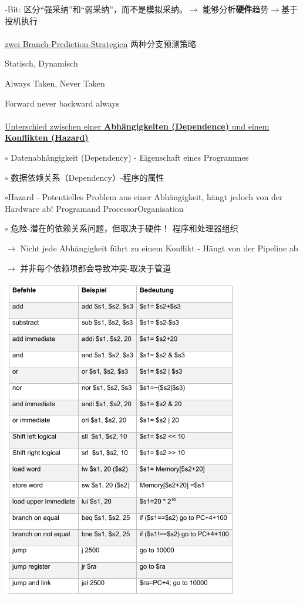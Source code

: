 \documentclass[fleqn]{article}
\begin{document}
-Bit: 区分“强采纳”和“弱采纳”，而不是模拟采纳。$\rightarrow$ 能够分析\textbf{硬件}趋势$\rightarrow$基于投机执行
\\
\\
\underline{zwei Branch-Prediction-Strategien} 两种分支预测策略

Statisch, Dynamisch 

Always Taken, Never Taken 

Forward never backward always
\\
\\
\noindent\underline{Unterschied zwischen einer \textbf{Abhängigkeiten (Dependence)} und einem \textbf{Konflikten (Hazard)}}

$\circ$ Datenabhängigkeit (Dependency) - Eigenschaft eines Programmes

$\circ$ 数据依赖关系（Dependency）-程序的属性

$\circ$Hazard - Potentielles Problem aus einer Abhängigkeit, hängt jedoch von der Hardware ab! Programand ProcessorOrganisation

$\circ$ 危险-潜在的依赖关系问题，但取决于硬件！ 程序和处理器组织

$\rightarrow$ Nicht jede Abhängigkeit führt zu einem Konflikt - Hängt von der Pipeline ab

$\rightarrow$ 并非每个依赖项都会导致冲突-取决于管道

\newpage

\begin{center}
    \includegraphics[scale=1]{36.png}
\end{center}
\end{document}
